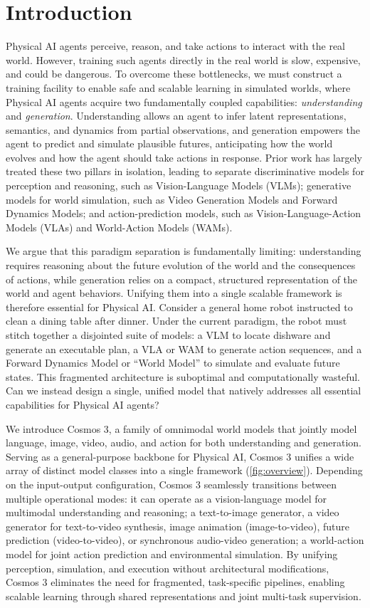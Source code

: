 \section{Introduction}
\label{sec::intro}

Physical AI agents perceive, reason, and take actions to interact with the real world. However, training such agents directly in the real world is slow, expensive, and could be dangerous. To overcome these bottlenecks, we must construct a training facility to enable safe and scalable learning in simulated worlds, where Physical AI agents acquire two fundamentally coupled capabilities: \textit{understanding} and \textit{generation}. Understanding allows an agent to infer latent representations, semantics, and dynamics from partial observations, and generation empowers the agent to predict and simulate plausible futures, anticipating how the world evolves and how the agent should take actions in response. Prior work has largely treated these two pillars in isolation, leading to separate discriminative models for perception and reasoning, such as Vision-Language Models (VLMs); generative models for world simulation, such as Video Generation Models and Forward Dynamics Models; and action-prediction models, such as Vision-Language-Action Models (VLAs) and World-Action Models (WAMs).

We argue that this paradigm separation is fundamentally limiting: understanding requires reasoning about the future evolution of the world and the consequences of actions, while generation relies on a compact, structured representation of the world and agent behaviors. Unifying them into a single scalable framework is therefore essential for Physical AI. Consider a general home robot instructed to clean a dining table after dinner. Under the current paradigm, the robot must stitch together a disjointed suite of models: a VLM to locate dishware and generate an executable plan, a VLA or WAM to generate action sequences, and a Forward Dynamics Model or ``World Model'' to simulate and evaluate future states. This fragmented architecture is suboptimal and computationally wasteful. Can we instead design a single, unified model that natively addresses all essential capabilities for Physical AI agents?

We introduce Cosmos 3, a family of omnimodal world models that jointly model language, image, video, audio, and action for both understanding and generation.
Serving as a general-purpose backbone for Physical AI, Cosmos 3 unifies a wide array of distinct model classes into a single framework (\cref{fig:overview}).
Depending on the input-output configuration, Cosmos 3 seamlessly transitions between multiple operational modes: it can operate as a vision-language model for multimodal understanding and reasoning; a text-to-image generator, a video generator for text-to-video synthesis, image animation (image-to-video), future prediction (video-to-video), or synchronous audio-video generation; a world-action model for joint action prediction and environmental simulation.
By unifying perception, simulation, and execution without architectural modifications, Cosmos 3 eliminates the need for fragmented, task-specific pipelines, enabling scalable learning through shared representations and joint multi-task supervision.

